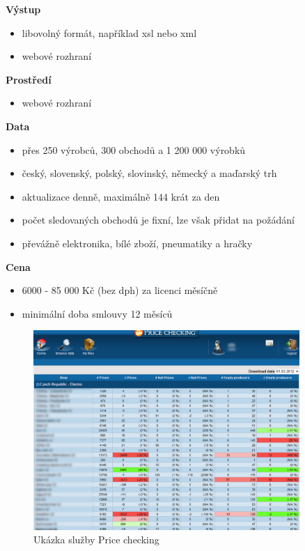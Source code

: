 \documentclass[thesis=B,czech]{FITthesis}[2012/06/26]
\begin{document}
\textbf{Výstup}
\begin{itemize}
\item libovolný formát, například xsl nebo xml
\item webové rozhraní
\end{itemize}

\textbf{Prostředí}
\begin{itemize}
\item webové rozhraní
\end{itemize}

\textbf{Data}
\begin{itemize}
\item přes 250 výrobců, 300 obchodů a 1 200 000 výrobků
\item český, slovenský, polský, slovinský, německý a maďarský trh
\item aktualizace denně, maximálně 144 krát za den
\item počet sledovaných obchodů je fixní, lze však přidat na požádání
\item převážně elektronika, bílé zboží, pneumatiky a hračky
\end{itemize}

\textbf{Cena}
\begin{itemize}
\item 6000 - 85 000 Kč (bez dph) za licenci měsíčně
\item minimální doba smlouvy 12 měsíců
\end{itemize}

\begin{figure}[h]\centering
 	\includegraphics[width=0.9\textwidth]{resources/priceChecking}
	\caption[Price checking]{Ukázka služby Price checking}\label{fig:priceChecking}
\end{figure}
\end{document}
